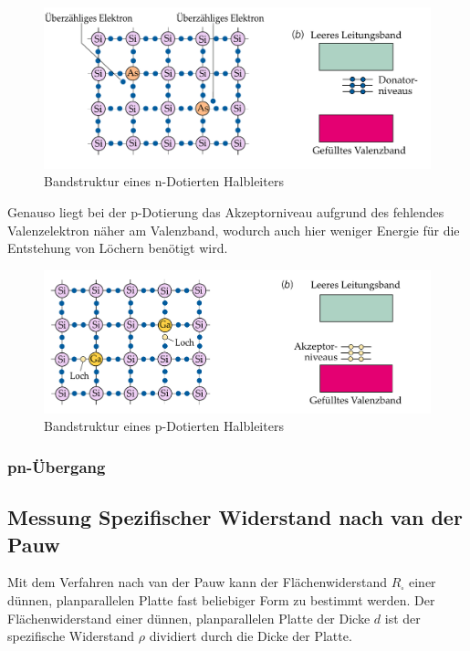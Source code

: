 \documentclass[a4paper]{scrartcl}
\numberwithin{equation}{subsection}
\begin{document}
\begin{figure}[H]
\includegraphics[width=12cm]{n-dotierter_Halbleiter}
\centering
\caption{Bandstruktur eines n-Dotierten Halbleiters \cite{tipler}}
\centering
\label{fig:bandstruktur-n-dotiert}
\end{figure}

Genauso liegt bei der p-Dotierung das Akzeptorniveau aufgrund des fehlendes Valenzelektron näher am Valenzband, wodurch auch hier weniger Energie für die Entstehung von Löchern benötigt wird. \cite{werk}

\begin{figure}[H]
\includegraphics[width=12cm]{p-dotierter_Halbleiter}
\centering
\caption{Bandstruktur eines p-Dotierten Halbleiters \cite{tipler}}
\centering
\label{fig:bandstruktur-p-dotiert}
\end{figure}

\subsubsection{pn-Übergang}

\subsection{Messung Spezifischer Widerstand nach van der Pauw}
Mit dem Verfahren nach van der Pauw kann der Flächenwiderstand $R_{\square}$ einer dünnen, planparallelen Platte fast beliebiger Form zu bestimmt werden. Der Flächenwiderstand einer dünnen, planparallelen Platte der Dicke $d$ ist der spezifische Widerstand $\rho$ dividiert durch die Dicke der Platte. 
\end{document}
